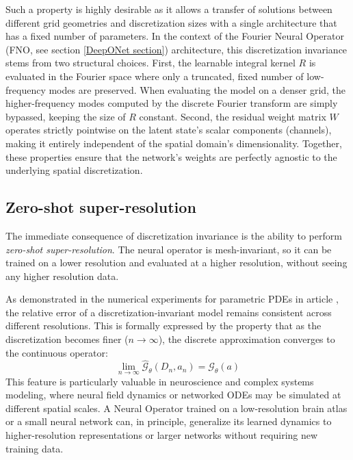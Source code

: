 Such a property is highly desirable as it allows a transfer of solutions between different grid geometries and discretization sizes with a single architecture that has a fixed number of parameters. 
In the context of the Fourier Neural Operator (FNO, see section \ref{DeepONet section}) architecture, this discretization invariance stems from two structural choices. First, the learnable integral kernel $R$ is evaluated in the Fourier space where only a truncated, fixed number of low-frequency modes are preserved. When evaluating the model on a denser grid, the higher-frequency modes computed by the discrete Fourier transform are simply bypassed, keeping the size of $R$ constant. Second, the residual weight matrix $W$ operates strictly pointwise on the latent state's scalar components (channels), making it entirely independent of the spatial domain's dimensionality. Together, these properties ensure that the network's weights are perfectly agnostic to the underlying spatial discretization.

\subsection{Zero-shot super-resolution}

The immediate consequence of discretization invariance is the ability to perform \textit{zero-shot super-resolution}. The neural operator is mesh-invariant, so it can be trained on a lower resolution and evaluated at a
higher resolution, without seeing any higher resolution data. 

As demonstrated in the numerical experiments for parametric PDEs in article \cite{li2020fourier}, the relative error of a discretization-invariant model remains consistent across different resolutions. This is formally expressed by the property that as the discretization becomes finer ($n \to \infty$), the discrete approximation converges to the continuous operator:
\[ 
\lim_{n \to \infty} \hat{\mathcal{G}}_{\theta}(D_n, a_n) = \mathcal{G}_{\theta}(a) 
\]
This feature is particularly valuable in neuroscience and complex systems modeling, where neural field dynamics or networked ODEs may be simulated at different spatial scales. A Neural Operator trained on a low-resolution brain atlas or a small neural network can, in principle, generalize its learned dynamics to higher-resolution representations or larger networks without requiring new training data.

